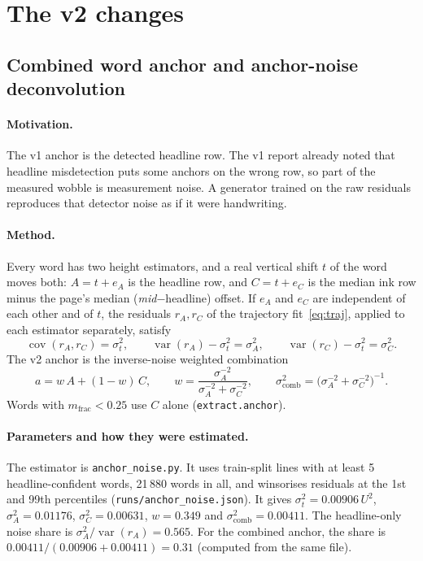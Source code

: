 \documentclass[11pt,a4paper]{article}
\newcommand{\U}{\ensuremath{U}}
\newcommand{\src}[1]{{\footnotesize\texttt{#1}}}
\begin{document}
\section{The v2 changes}
\label{sec:changes}

\subsection{Combined word anchor and anchor-noise deconvolution}
\label{sec:anchor}
\paragraph{Motivation.} The v1 anchor is the detected headline row. The v1
report already noted that headline misdetection puts some anchors on the wrong
row, so part of the measured wobble is measurement noise. A generator trained
on the raw residuals reproduces that detector noise as if it were handwriting.

\paragraph{Method.} Every word has two height estimators, and a real vertical
shift $t$ of the word moves both:
$A = t + e_A$ is the headline row, and $C = t + e_C$ is the median ink row
minus the page's median (\textit{mid}$-$headline) offset. If $e_A$ and $e_C$
are independent of each other and of $t$, the residuals $r_A,r_C$ of the
trajectory fit~\eqref{eq:traj}, applied to each estimator separately, satisfy
\begin{equation}
\operatorname{cov}(r_A,r_C)=\sigma_t^2,\qquad
\operatorname{var}(r_A)-\sigma_t^2=\sigma_A^2,\qquad
\operatorname{var}(r_C)-\sigma_t^2=\sigma_C^2 .
\end{equation}
The v2 anchor is the inverse-noise weighted combination
\begin{equation}
a = w\,A + (1-w)\,C,\qquad
w=\frac{\sigma_A^{-2}}{\sigma_A^{-2}+\sigma_C^{-2}},\qquad
\sigma_\text{comb}^2=\big(\sigma_A^{-2}+\sigma_C^{-2}\big)^{-1}.
\end{equation}
Words with $m_\text{frac}<0.25$ use $C$ alone
(\texttt{extract.anchor}).

\paragraph{Parameters and how they were estimated.} The estimator is
\texttt{anchor\_noise.py}. It uses train-split lines with at least 5
headline-confident words, 21\,880 words in all, and winsorises residuals at
the 1st and 99th percentiles (\src{runs/anchor\_noise.json}). It gives
$\sigma_t^2=0.00906\,\U^2$, $\sigma_A^2=0.01176$, $\sigma_C^2=0.00631$,
$w=0.349$ and $\sigma_\text{comb}^2=0.00411$. The headline-only noise share
is $\sigma_A^2/\operatorname{var}(r_A)=0.565$. For the combined anchor,
the share is $0.00411/(0.00906+0.00411)=0.31$ (computed from the same file).
\end{document}
